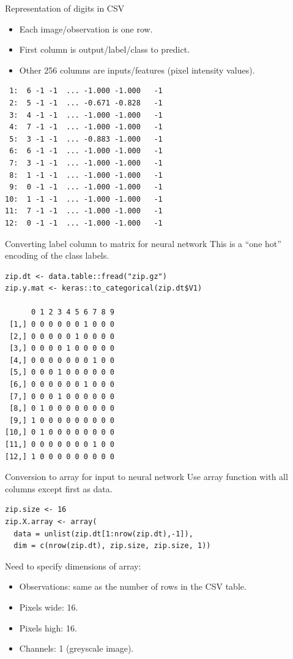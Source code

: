 \documentclass[12pt]{article}
\begin{document}
{Representation of digits in CSV}
  \begin{itemize}
  \item Each image/observation is one row.
  \item First column is output/label/class to predict.
  \item Other 256 columns are inputs/features (pixel intensity
    values).
  \end{itemize}
\begin{verbatim}
 1:  6 -1 -1  ... -1.000 -1.000   -1
 2:  5 -1 -1  ... -0.671 -0.828   -1
 3:  4 -1 -1  ... -1.000 -1.000   -1
 4:  7 -1 -1  ... -1.000 -1.000   -1
 5:  3 -1 -1  ... -0.883 -1.000   -1
 6:  6 -1 -1  ... -1.000 -1.000   -1
 7:  3 -1 -1  ... -1.000 -1.000   -1
 8:  1 -1 -1  ... -1.000 -1.000   -1
 9:  0 -1 -1  ... -1.000 -1.000   -1
10:  1 -1 -1  ... -1.000 -1.000   -1
11:  7 -1 -1  ... -1.000 -1.000   -1
12:  0 -1 -1  ... -1.000 -1.000   -1
\end{verbatim}

{Converting label column to matrix for neural network}
  This is a ``one hot'' encoding of the class labels.
\begin{verbatim}
zip.dt <- data.table::fread("zip.gz")
zip.y.mat <- keras::to_categorical(zip.dt$V1)

      0 1 2 3 4 5 6 7 8 9
 [1,] 0 0 0 0 0 0 1 0 0 0
 [2,] 0 0 0 0 0 1 0 0 0 0
 [3,] 0 0 0 0 1 0 0 0 0 0
 [4,] 0 0 0 0 0 0 0 1 0 0
 [5,] 0 0 0 1 0 0 0 0 0 0
 [6,] 0 0 0 0 0 0 1 0 0 0
 [7,] 0 0 0 1 0 0 0 0 0 0
 [8,] 0 1 0 0 0 0 0 0 0 0
 [9,] 1 0 0 0 0 0 0 0 0 0
[10,] 0 1 0 0 0 0 0 0 0 0
[11,] 0 0 0 0 0 0 0 1 0 0
[12,] 1 0 0 0 0 0 0 0 0 0
\end{verbatim}

{Conversion to array for input to neural network}
Use array function with all columns except first as data.  
\begin{verbatim}
zip.size <- 16
zip.X.array <- array(
  data = unlist(zip.dt[1:nrow(zip.dt),-1]),
  dim = c(nrow(zip.dt), zip.size, zip.size, 1))
\end{verbatim}
Need to specify dimensions of array:
\begin{itemize}
\item Observations: same as the number of rows in the CSV table.
\item Pixels wide: 16.
\item Pixels high: 16.
\item Channels: 1 (greyscale image).
\end{itemize}
\end{document}
